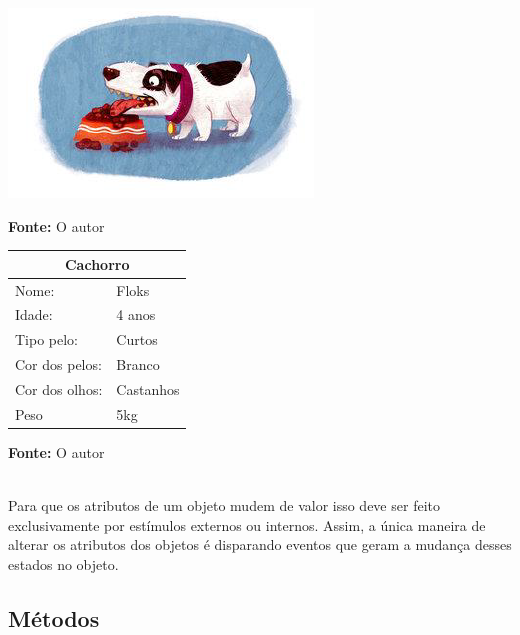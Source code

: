   \begin{minipage}{\textwidth}
    \begin{minipage}[b]{0.49\textwidth}
      \centering
      \includegraphics[scale=0.6]{imagens/cachorro-objeto-2.png}
      \caption*{\textbf{Fonte:} O autor}
      \label{fig:cachorro-objeto-2}
    \end{minipage}
    \hfill
    \begin{minipage}[b]{0.49\textwidth}
      \centering
      \begin{tabular}{|l|l|}
        \hline
        \multicolumn{2}{|c|}{Cachorro}      \\ \hline
          Nome:                 & Floks     \\ \hline
          Idade:                & 4 anos    \\ \hline
          Tipo pelo:            & Curtos    \\ \hline
          Cor dos pelos:        & Branco    \\ \hline
          Cor dos olhos:        & Castanhos \\ \hline
          Peso                  & 5kg       \\ \hline
        \end{tabular}
        \caption*{\textbf{Fonte:} O autor}
      \end{minipage}
    \end{minipage} \\ 

Para que os atributos de um objeto mudem de valor isso deve ser feito  exclusivamente por estímulos externos ou internos. Assim, a única maneira  de alterar os atributos dos objetos é disparando eventos que geram a mudança desses estados no objeto.

\subsection{Métodos}

